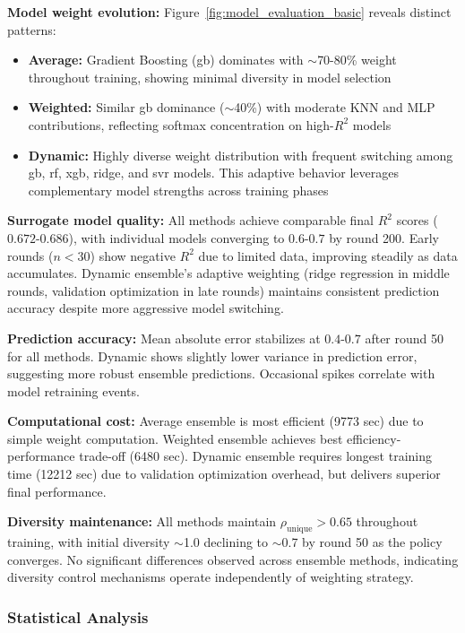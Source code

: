 \documentclass[conference]{IEEEtran}
\begin{document}
\textbf{Model weight evolution:} Figure~\ref{fig:model_evaluation_basic} reveals distinct patterns:
\begin{itemize}
    \item \textbf{Average:} Gradient Boosting (gb) dominates with $\sim$70-80\% weight throughout training, showing minimal diversity in model selection
    \item \textbf{Weighted:} Similar gb dominance ($\sim$40\%) with moderate KNN and MLP contributions, reflecting softmax concentration on high-$R^2$ models
    \item \textbf{Dynamic:} Highly diverse weight distribution with frequent switching among gb, rf, xgb, ridge, and svr models. This adaptive behavior leverages complementary model strengths across training phases
\end{itemize}

\textbf{Surrogate model quality:} All methods achieve comparable final $R^2$ scores ($0.672$-$0.686$), with individual models converging to $0.6$-$0.7$ by round 200. Early rounds ($n < 30$) show negative $R^2$ due to limited data, improving steadily as data accumulates. Dynamic ensemble's adaptive weighting (ridge regression in middle rounds, validation optimization in late rounds) maintains consistent prediction accuracy despite more aggressive model switching.

\textbf{Prediction accuracy:} Mean absolute error stabilizes at $0.4$-$0.7$ after round 50 for all methods. Dynamic shows slightly lower variance in prediction error, suggesting more robust ensemble predictions. Occasional spikes correlate with model retraining events.

\textbf{Computational cost:} Average ensemble is most efficient (9773 sec) due to simple weight computation. Weighted ensemble achieves best efficiency-performance trade-off (6480 sec). Dynamic ensemble requires longest training time (12212 sec) due to validation optimization overhead, but delivers superior final performance.

\textbf{Diversity maintenance:} All methods maintain $\rho_{\text{unique}} > 0.65$ throughout training, with initial diversity $\sim$1.0 declining to $\sim$0.7 by round 50 as the policy converges. No significant differences observed across ensemble methods, indicating diversity control mechanisms operate independently of weighting strategy.

\subsubsection{Statistical Analysis}
\end{document}
